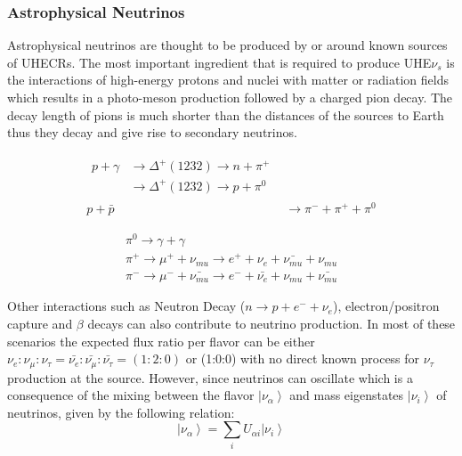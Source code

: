 \subsubsection*{Astrophysical Neutrinos}
\label{subsubsec:AstroNu}

Astrophysical neutrinos are thought to be produced by or around known sources of UHECRs. The most important ingredient that is required to produce UHE$\nu_s$ is the interactions of high-energy protons and nuclei with matter or radiation fields which results in a photo-meson production followed by a charged pion decay. The decay length of pions is much shorter than the distances of the sources to Earth thus they decay and give rise to secondary neutrinos. 

\begin{subequations}\label{eq:Nuprod_1}
  \begin{align}
    \begin{split}
      p + \gamma &\longrightarrow \Delta^+(1232 ) \longrightarrow n+\pi^+ \\ 
                      &\longrightarrow \Delta^+(1232 ) \longrightarrow p+\pi^0
    \end{split} \\
      p + \bar{p} &\longrightarrow \pi^- + \pi^+ + \pi^0 
  \end{align}
\end{subequations}

\begin{subequations}\label{eq:Nuprod_2}
  \begin{align}  
    \pi^0 \longrightarrow \gamma + \gamma \\
    \pi^+ \longrightarrow \mu^+ + \nu_{mu} \longrightarrow e^+ + \nu_{e} + \bar{\nu_{mu}} + \nu_{mu} \\
    \pi^- \longrightarrow \mu^- + \bar{\nu_{mu}} \longrightarrow e^- + \bar{\nu_{e}} + \nu_{mu} + \bar{\nu_{mu}}
  \end{align}
\end{subequations}

Other interactions such as Neutron Decay ($n \longrightarrow p + e^- + \nu_{e} $), electron/positron capture and $\beta$ decays can also contribute to neutrino production. In most of these scenarios the expected flux ratio per flavor can be either $ \nu_{e} : \nu_{\mu} : \nu_{\tau} = \bar{\nu_{e}}: \bar{\nu_{\mu}}: \bar{\nu_{\tau}} = (1:2:0) $ or (1:0:0) with no direct known process for $\nu_{\tau}$ production at the source. However, since neutrinos can oscillate which is a consequence of the mixing between the flavor  $\left| \nu_{\alpha} \right\rangle $ and mass eigenstates $\left| \nu_{i} \right\rangle $  of neutrinos, given by the following relation:
\begin{equation}
\left| \nu_{\alpha} \right\rangle  = \sum_i U_{\alpha i} \left| \nu_{i} \right\rangle
\end{equation}

